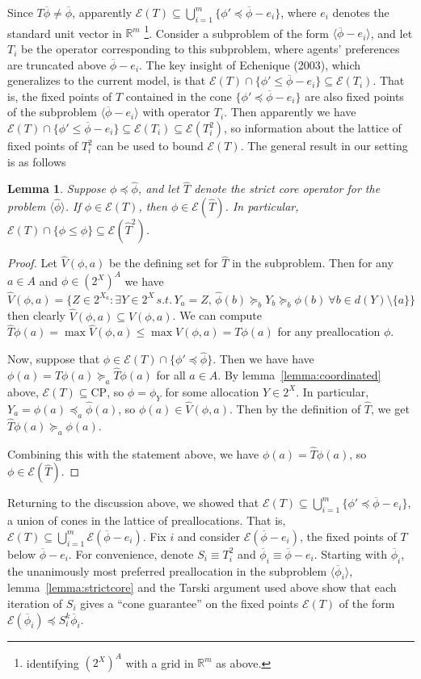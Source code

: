 \documentclass[11pt,reqno]{amsart}
\newtheorem{lemma}[thm]{Lemma}
\theoremstyle{definition}
\numberwithin{equation}{section}
\newcommand{\prf}{\begin{proof}}
\newcommand{\eprf}{\end{proof}}
\newcommand{\wh}{\widehat}
\newcommand{\mr}{\mathbb{R}}
\newcommand{\ol}{\overline}
\newcommand{\lag}{\langle}
\newcommand{\rag}{\rangle}
\newcommand{\pre}{\phi}
\newcommand{\coordpre}{\mathrm{CP}}
\newcommand{\prealloc}{(2^X)^A}
\newcommand{\sub}{\subseteq}
\newcommand{\fix}{\mathcal{E}}
\newcommand{\suq}{\succeq}
\newcommand{\peq}{\preceq}
\newcommand{\toppre}{\ol{\pre}}
\begin{document}
Since $T\toppre \not = \toppre$, apparently $\fix(T) \sub \bigcup_{i = 1}^m \{\pre' \peq \toppre - e_i\}$, where $e_i$ denotes the standard unit vector in $\mr^m$ \footnote{identifying $\prealloc$ with a grid in $\mr^m$ as above.}. 
Consider a subproblem of the form $\lag \toppre - e_i \rag$, and let $T_i$ be the operator corresponding to this subproblem, where agents' preferences are truncated above $\toppre - e_i$.
The key insight of Echenique (2003), which generalizes to the current model, is that $\fix(T) \cap \{\pre' \leq \toppre - e_i\} \sub \fix(T_i)$.
That is, the fixed points of $T$ contained in the cone $\{\pre' \peq \toppre - e_i\}$ are also fixed points of the subproblem $\lag \toppre - e_i \rag$ with operator $T_i$. 
Then apparently we have $\fix(T) \cap \{\pre' \leq \toppre - e_i\} \sub \fix(T_i) \sub \fix(T_i^2)$, so information about the lattice of fixed points of $T_i^2$ can be used to bound $\fix(T)$.
The general result in our setting is as follows 
\begin{lemma} \label{lemma:contain}
Suppose $\pre \peq \wh{\pre}$, and let $\wh{T}$ denote the strict core operator for the problem $\lag \wh{\pre} \rag$.
If $\pre \in \fix(T)$, then $\pre \in \fix(\wh{T})$.
In particular, $\fix(T) \cap \{\pre \leq \wh{\pre}\} \sub \fix(\wh{T}^2)$. 
\end{lemma}
\prf
Let $\wh{V}(\pre, a)$ be the defining set for $\wh{T}$ in the subproblem.
Then for any $a \in A$ and $\pre \in \prealloc$ we have 
$\wh{V}(\pre,a)  = \{Z \in 2^{X_a}: \exists Y \in 2^X \, s.t. \,  Y_a = Z, \, \wh{\pre}(b) \suq_b Y_b \suq_b \pre(b) \: \forall b \in d(Y)\setminus\{a\} \}$
then clearly $\wh{V}(\pre,a) \sub V(\pre,a)$.  
We can compute $\wh{T}\pre(a) = \max \wh{V}(\pre,a) \leq \max V(\pre,a) = T\pre(a)$ for any preallocation $\pre$. 

Now, suppose that $\pre \in \fix(T)\cap\{\pre' \peq \wh{\pre}\}$.
Then we have have $\pre(a) = T\pre(a) \suq_a \wh{T}\pre(a)$ for all $a \in A$. 
By lemma~\ref{lemma:coordinated} above, $\fix(T) \sub \coordpre$, so $\pre = \pre_Y$ for some allocation $Y \in 2^X$.
In particular, $Y_a = \pre(a) \peq_a \wh{\pre}(a)$, so $\pre(a) \in \wh{V}(\pre,a)$.
Then by the definition of $\wh{T}$, we get $\wh{T}\pre(a) \suq_a \pre(a)$. 

Combining this with the statement above, we have $\pre(a) = \wh{T} \pre(a)$, so $\pre \in \fix(\wh{T})$. 
\eprf 
Returning to the discussion above, we showed that $\fix(T) \sub \bigcup_{i = 1}^m \{\pre' \peq \toppre - e_i\}$, a union of cones in the lattice of preallocations. 
That is, $\fix(T) \sub \bigcup_{i = 1}^m \fix(\toppre - e_i)$.
Fix $i$ and consider $\fix(\toppre - e_i)$, the fixed points of $T$ below $\toppre - e_i$.
For convenience, denote $S_i \equiv T_i^2$ and $\toppre_i \equiv \toppre - e_i$.
Starting with $\toppre_i$, the unanimously most preferred preallocation in the subproblem $\lag \toppre_i \rag$, lemma~\ref{lemma:strictcore} and the Tarski argument used above show that each iteration of $S_i$ gives a ``cone guarantee'' on the fixed points $\fix(T)$ of the form $\fix(\toppre_i) \peq S_i^k \toppre_i$.
\end{document}
